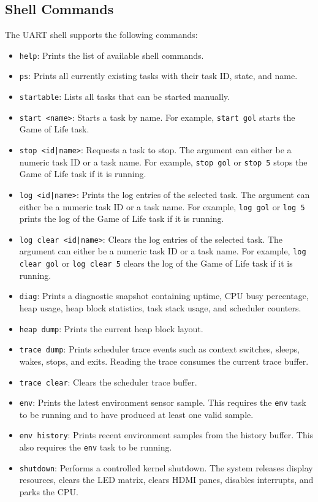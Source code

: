 \subsection{Shell Commands}

The UART shell supports the following commands:
\begin{itemize}
    \item \texttt{help}: Prints the list of available shell commands.
    \item \texttt{ps}: Prints all currently existing tasks with their task ID, state, and name.
    \item \texttt{startable}: Lists all tasks that can be started manually.
    \item \texttt{start <name>}: Starts a task by name. For example, \texttt{start gol} starts the Game of Life task.
    \item \texttt{stop <id|name>}: Requests a task to stop. The argument can either be a numeric task ID or a task name. For example, \texttt{stop gol} or \texttt{stop 5} stops the Game of Life task if it is running.
    \item \texttt{log <id|name>}: Prints the log entries of the selected task. The argument can either be a numeric task ID or a task name. For example, \texttt{log gol} or \texttt{log 5} prints the log of the Game of Life task if it is running.
    \item \texttt{log clear <id|name>}: Clears the log entries of the selected task. The argument can either be a numeric task ID or a task name. For example, \texttt{log clear gol} or \texttt{log clear 5} clears the log of the Game of Life task if it is running.
    \item \texttt{diag}: Prints a diagnostic snapshot containing uptime, CPU busy percentage, heap usage, heap block statistics, task stack usage, and scheduler counters.
    \item \texttt{heap dump}: Prints the current heap block layout.
    \item \texttt{trace dump}: Prints scheduler trace events such as context switches, sleeps, wakes, stops, and exits. Reading the trace consumes the current trace buffer.
    \item \texttt{trace clear}: Clears the scheduler trace buffer.
    \item \texttt{env}: Prints the latest environment sensor sample. This requires the \texttt{env} task to be running and to have produced at least one valid sample.
    \item \texttt{env history}: Prints recent environment samples from the history buffer. This also requires the \texttt{env} task to be running.
    \item \texttt{shutdown}: Performs a controlled kernel shutdown. The system releases display resources, clears the LED matrix, clears HDMI panes, disables interrupts, and parks the CPU.

\end{itemize}

